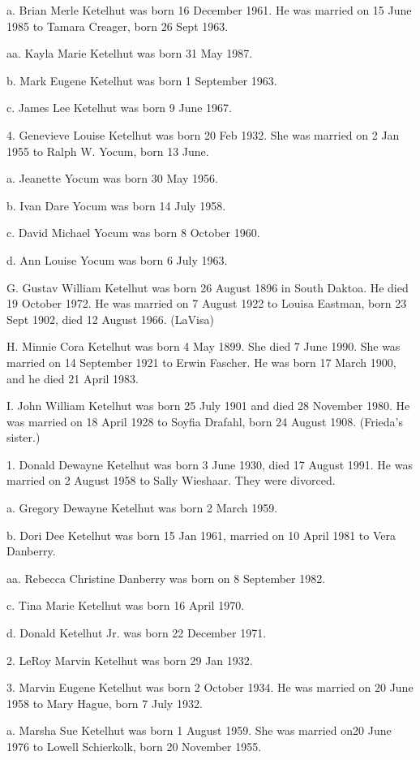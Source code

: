 \documentclass[a4paper]{article}
\begin{document}
a. Brian Merle Ketelhut was born 16 December 1961.  He was married on 15 June 1985 to Tamara Creager, born 26 Sept 1963.

aa. Kayla Marie Ketelhut was born 31 May 1987.

b. Mark Eugene Ketelhut was born 1 September 1963.

c. James Lee Ketelhut was born 9 June 1967.

4. Genevieve Louise Ketelhut was born 20 Feb 1932.  She was married on 2 Jan 1955 to Ralph W. Yocum, born 13 June.

a. Jeanette Yocum was born 30 May 1956.

b. Ivan Dare Yocum was born 14 July 1958.

c. David Michael Yocum was born 8 October 1960.

d. Ann Louise Yocum was born 6 July 1963.

G. Gustav William Ketelhut was born 26 August 1896 in South Daktoa.  He died 19 October 1972.  He was married on 7 August 1922 to Louisa Eastman, born 23 Sept 1902, died 12 August 1966. (LaVisa)

H.  Minnie Cora Ketelhut was born 4 May 1899.  She died 7 June 1990.  She was married on 14 September 1921 to Erwin Fascher.  He was born 17 March 1900, and he died 21 April 1983.

I. John William Ketelhut was born 25 July 1901 and died 28 November 1980.  He was married on 18 April 1928 to Soyfia Drafahl, born 24 August 1908.  (Frieda's sister.)

1. Donald Dewayne Ketelhut was born 3 June 1930, died 17 August 1991.  He was married on 2 August 1958 to Sally Wieshaar.  They were divorced.

a. Gregory Dewayne Ketelhut was born 2 March 1959.

b. Dori Dee Ketelhut was born 15 Jan 1961, married on 10 April 1981 to Vera Danberry.

aa. Rebecca Christine Danberry was born on 8 September 1982.

c. Tina Marie Ketelhut was born 16 April 1970.

d. Donald Ketelhut Jr. was born 22 December 1971.

2. LeRoy Marvin Ketelhut was born 29 Jan 1932.

3. Marvin Eugene Ketelhut was born 2 October 1934.  He was married on 20 June 1958 to Mary Hague, born 7 July 1932.

a. Marsha Sue Ketelhut was born 1 August 1959.  She was married on20 June 1976 to Lowell Schierkolk, born 20 November 1955.
\end{document}
